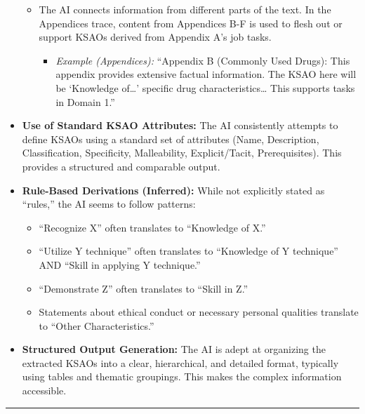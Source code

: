\documentclass[
  letterpaper,
  DIV=11,
  numbers=noendperiod]{scrartcl}
\providecommand{\tightlist}{%
  \setlength{\itemsep}{0pt}\setlength{\parskip}{0pt}}
\begin{document}
\begin{itemize}
  \begin{itemize}
  \tightlist
  \item
    The AI connects information from different parts of the text. In the
    Appendices trace, content from Appendices B-F is used to flesh out
    or support KSAOs derived from Appendix A's job tasks.

    \begin{itemize}
    \tightlist
    \item
      \emph{Example (Appendices):} ``Appendix B (Commonly Used Drugs):
      This appendix provides extensive factual information. The KSAO
      here will be `Knowledge of\ldots{}' specific drug
      characteristics\ldots{} This supports tasks in Domain 1.''
    \end{itemize}
  \end{itemize}
\item
  \textbf{Use of Standard KSAO Attributes:} The AI consistently attempts
  to define KSAOs using a standard set of attributes (Name, Description,
  Classification, Specificity, Malleability, Explicit/Tacit,
  Prerequisites). This provides a structured and comparable output.
\item
  \textbf{Rule-Based Derivations (Inferred):} While not explicitly
  stated as ``rules,'' the AI seems to follow patterns:

  \begin{itemize}
  \tightlist
  \item
    ``Recognize X'' often translates to ``Knowledge of X.''
  \item
    ``Utilize Y technique'' often translates to ``Knowledge of Y
    technique'' AND ``Skill in applying Y technique.''
  \item
    ``Demonstrate Z'' often translates to ``Skill in Z.''
  \item
    Statements about ethical conduct or necessary personal qualities
    translate to ``Other Characteristics.''
  \end{itemize}
\item
  \textbf{Structured Output Generation:} The AI is adept at organizing
  the extracted KSAOs into a clear, hierarchical, and detailed format,
  typically using tables and thematic groupings. This makes the complex
  information accessible.
\end{itemize}

\begin{center}\rule{0.5\linewidth}{0.5pt}\end{center}
\end{document}
